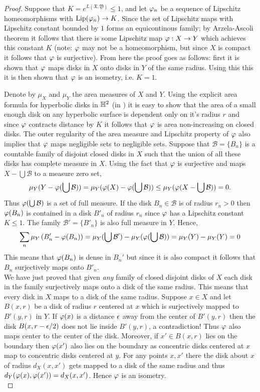 \begin{proof}
  Suppose that $ K = e^{L(\mathfrak{X}, \mathfrak{Y})} \leq 1$, and let $\varphi_n$ be a sequence of Lipschitz homeomorphisms with $\text{Lip}(\varphi_n) \to K$. Since the set of Lipschitz maps with Lipschitz constant bounded by $1$ forms an equicontinous family; by Arzela-Ascoli theorem it follows that there is some Lipschitz map $\varphi:X\to Y$ which achieves this constant $K$ (note: $\varphi$ may not be a homeomorphism, but since $X$ is compact it follows that $\varphi$ is surjective). From here the proof goes as follows: first it is shown that $\varphi$ maps disks in $X$ onto disks in $Y$ of the same radius. Using this this it is then shown that $\varphi$ is an isometry, i.e. $K=1$. 

  Denote by $\mu_X$ and $\mu_Y$ the area measures of $X$ and $Y$. Using the explicit area formula for hyperbolic disks in $\mathbb{H}^2$ (in \cite{katok}) it is easy to show that the area of a small enough disk on any hyperbolic surface is dependent only on it's radius $r$ and since $\varphi$ contracts distance by $K$ it follows that $\varphi$ is area non-increasing on closed disks. The outer regularity of the area measure and Lipschitz property of $\varphi$ also implies that $\varphi$ maps negligible sets to negligible sets. Suppose that $ \mathcal{B} = \{B_n\}$ is a countable family of disjoint closed disks in $X$ such that the union of all these disks has complete measure in $X$. Using the fact that $\varphi$ is surjective and maps $X-\bigcup \mathcal{B}$ to a measure zero set,
  $$\mu_Y(Y-\varphi(\bigcup \mathcal{B})) = \mu_Y(\varphi(X)-\varphi(\bigcup \mathcal{B}))\leq \mu_Y(\varphi(X-\bigcup \mathcal{B})) =0.$$ 
  Thus $\varphi(\bigcup \mathcal{B})$ is a set of full measure. If the disk $B_n\in \mathcal{B}$ is of radius $r_n>0$ then $\varphi(B_n)$ is contained in a disk $B'_n$ of radius $r_n$ since $\varphi$ has a Lipschitz constant $K\leq 1$. The family $ \mathcal{B}' = \{B'_n\}$ is also full measure in $Y$. Hence,
  $$\sum_n\mu_Y\left(B_n'- \varphi(B_n)\right)= \mu_Y(\bigcup \mathcal{B}') - \mu_Y(\varphi(\bigcup \mathcal{B})) =\mu_Y(Y)- \mu_Y(Y)= 0$$
  This means that $\varphi(B_n)$ is dense in $B_n'$ but since it is also compact it follows that $B_n$ surjectively maps onto $B'_n$.\\

  We have just proved that given \textit{any} family of closed disjoint disks of $X$ each disk in the family surjectively maps onto a disk of the same radius. This means that every disk in $X$ maps to a disk of the same radius. Suppose $x\in X$ and let $B(x,r)$ be a disk of radius $r$ centered at $x$ which is surjectively mapped to $B'(y,r)$ in $Y$. If $\varphi(x)$ is a distance $\epsilon$ away from the center of $B'(y,r)$ then the disk $B(x,r-\epsilon/2)$ does not lie inside $B'(y,r)$, a contradiction! Thus $\varphi$ also maps center to the center of the disk. Moreover, if $x'\in B(x,r)$ lies on the boundary then $\varphi(x')$ also lies on the boundary as concentric disks centered at $x$ map to concentric disks centered at $y$. For any points $x,x'$ there the disk about $x$ of radius $d_X(x,x')$ gets mapped to a disk of the same radius and thus $d_Y(\varphi(x),\varphi(x'))= d_X(x,x')$. Hence $\varphi$ is an isometry.\\


\end{proof}
